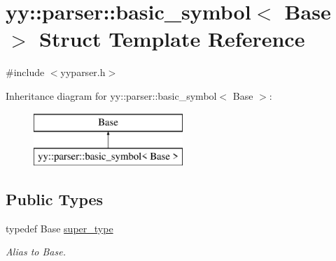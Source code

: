 \hypertarget{structyy_1_1parser_1_1basic__symbol}{}\section{yy\+:\+:parser\+:\+:basic\+\_\+symbol$<$ Base $>$ Struct Template Reference}
\label{structyy_1_1parser_1_1basic__symbol}


{\ttfamily \#include $<$yyparser.\+h$>$}

Inheritance diagram for yy\+:\+:parser\+:\+:basic\+\_\+symbol$<$ Base $>$\+:\begin{figure}[H]
\begin{center}
\leavevmode
\includegraphics[height=2.000000cm]{structyy_1_1parser_1_1basic__symbol}
\end{center}
\end{figure}
\subsection*{Public Types}
\begin{DoxyCompactItemize}
\item 
\mbox{\label{structyy_1_1parser_1_1basic__symbol_aa67d0c9c65599dcf9d193b33743dae20}} 
typedef Base \hyperlink{structyy_1_1parser_1_1basic__symbol_aa67d0c9c65599dcf9d193b33743dae20}{super\+\_\+type}
\begin{DoxyCompactList}\small\item\em Alias to Base. \end{DoxyCompactList}\end{DoxyCompactItemize}
